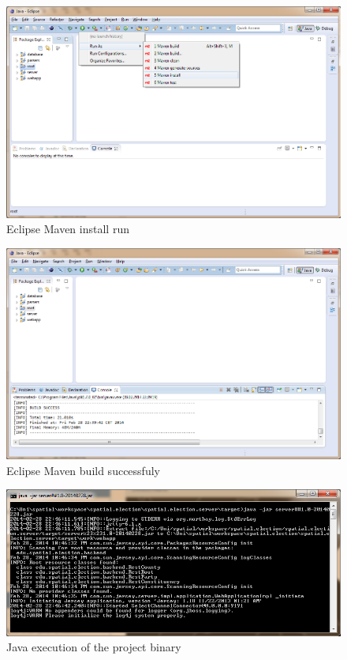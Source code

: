 \begin{figure}[htbp]
\centering
  \includegraphics[width=1.1\textwidth]{../img/fvcN51B.png}
\caption{Eclipse Maven install run}
\label{run03}
\end{figure}


\begin{figure}[htbp]
\centering
  \includegraphics[width=1.1\textwidth]{../img/v13HHJO.png}
\caption{Eclipse Maven build successfuly}
\label{run04}
\end{figure}
  
  
\begin{figure}[htbp]
\centering
  \includegraphics[width=1.1\textwidth]{../img/wFn3GVG.png}
\caption{Java execution of the project binary}
\label{run05}
\end{figure}

